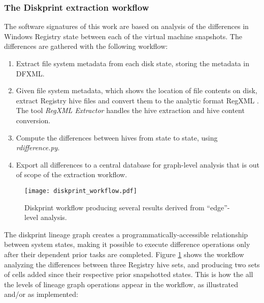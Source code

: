 \documentclass[11pt]{ucthesis}
\theoremstyle{plain}
\theoremstyle{definition}
\newcommand{\rdifference}{\emph{rdifference.py}\xspace}
\newcommand{\Regxmlextractor}{\emph{RegXML Extractor}\xspace}
\begin{document}
\subsubsection{The Diskprint extraction workflow}
\label{sec:diskprintworkflow}

The software signatures of this work are based on analysis of the differences in Windows Registry state between each of the virtual machine snapshots.  The differences are gathered with the following workflow:

\begin{enumerate}
\item Extract file system metadata from each disk state, storing the metadata in DFXML.
\item Given file system metadata, which shows the location of file contents on disk, extract Registry hive files and convert them to the analytic format RegXML \cite{nelson:ifip12}.  The tool \Regxmlextractor \cite{nelson:rx} handles the hive extraction and hive content conversion.
\item Compute the differences between hives from state to state, using \rdifference.
\item Export all differences to a central database \cite{nelson:ddb} for graph-level analysis that is out of scope of the extraction workflow.
\end{enumerate}

\begin{figure}
\begin{center}
\texttt{[image: diskprint\_workflow.pdf]}
\caption{\label{fig:diskprintworkflow} Diskprint workflow producing several results derived from ``edge''-level analysis.}
\end{center}
\end{figure}

The diskprint lineage graph creates a programmatically-accessible relationship between system states, making it possible to execute difference operations only after their dependent prior tasks are completed.  Figure \ref{fig:diskprintworkflow} shows the workflow analyzing the differences between three Registry hive sets, and producing two sets of cells added since their respective prior snapshotted states.  This is how the all the levels of lineage graph operations appear in the workflow, as illustrated and/or as implemented:
\end{document}
